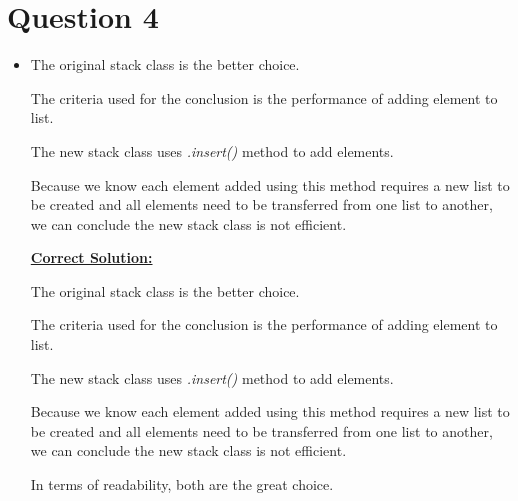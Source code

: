 \documentclass[12pt]{article}
\begin{document}
\section*{Question 4}
\begin{itemize}
    \item

    The original stack class is the better choice.

    \bigskip

    The criteria used for the conclusion is the performance of adding element
    to list.

    \bigskip

    The new stack class uses \textit{.insert()} method to add
    elements.

    \bigskip

    Because we know each element added using this method requires a new list to
    be created and all elements need to be transferred from one list to another,
    we can conclude the new stack class is not efficient.

    \bigskip

    \begin{mdframed}
        \underline{\textbf{Correct Solution:}}

        \bigskip

        The original stack class is the better choice.

        \bigskip

        The criteria used for the conclusion is the performance of adding element
        to list.

        \bigskip

        The new stack class uses \textit{.insert()} method to add
        elements.

        \bigskip

        Because we know each element added using this method requires a new list to
        be created and all elements need to be transferred from one list to another,
        we can conclude the new stack class is not efficient.

        \bigskip

        \color{red}In terms of readability, both are the great choice.\color{black}

    \end{mdframed}

\end{itemize}
\end{document}
